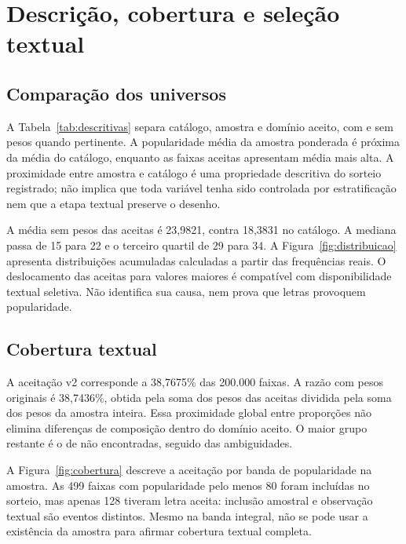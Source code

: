 \chapter{Descrição, cobertura e seleção textual}\label{cap:descritiva}
\section{Comparação dos universos}
A Tabela~\ref{tab:descritivas} separa catálogo, amostra e domínio aceito, com e sem pesos quando pertinente. A popularidade média da amostra ponderada é próxima da média do catálogo, enquanto as faixas aceitas apresentam média mais alta. A proximidade entre amostra e catálogo é uma propriedade descritiva do sorteio registrado; não implica que toda variável tenha sido controlada por estratificação nem que a etapa textual preserve o desenho.



A média sem pesos das aceitas é 23,9821, contra 18,3831 no catálogo. A mediana passa de 15 para 22 e o terceiro quartil de 29 para 34. A Figura~\ref{fig:distribuicao} apresenta distribuições acumuladas calculadas a partir das frequências reais. O deslocamento das aceitas para valores maiores é compatível com disponibilidade textual seletiva. Não identifica sua causa, nem prova que letras provoquem popularidade.

\FloatBarrier

\section{Cobertura textual}
A aceitação v2 corresponde a 38,7675\% das 200.000 faixas. A razão com pesos originais é 38,7436\%, obtida pela soma dos pesos das aceitas dividida pela soma dos pesos da amostra inteira. Essa proximidade global entre proporções não elimina diferenças de composição dentro do domínio aceito. O maior grupo restante é o de não encontradas, seguido das ambiguidades.

A Figura~\ref{fig:cobertura} descreve a aceitação por banda de popularidade na amostra. As 499 faixas com popularidade pelo menos 80 foram incluídas no sorteio, mas apenas 128 tiveram letra aceita: inclusão amostral e observação textual são eventos distintos. Mesmo na banda integral, não se pode usar a existência da amostra para afirmar cobertura textual completa.

